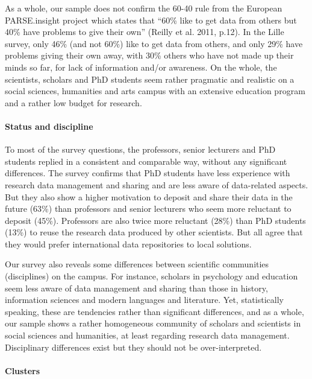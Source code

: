 \documentclass[a4paper,
fontsize=11pt,
oneside,
numbers=noperiodatend,
parskip=half-,
bibliography=totoc,
final
]{scrartcl}
\begin{document}
As a whole, our sample does not confirm the 60-40 rule from the European
PARSE.insight project which states that \enquote{60\% like to get data
from others but 40\% have problems to give their own} (Reilly et al.
2011, p.12). In the Lille survey, only 46\% (and not 60\%) like to get
data from others, and only 29\% have problems giving their own away,
with 30\% others who have not made up their minds so far, for lack of
information and/or awareness. On the whole, the scientists, scholars and
PhD students seem rather pragmatic and realistic on a social sciences,
humanities and arts campus with an extensive education program and a
rather low budget for research.

\paragraph{Status and discipline}\label{status-and-discipline}

To most of the survey questions, the professors, senior lecturers and
PhD students replied in a consistent and comparable way, without any
significant differences. The survey confirms that PhD students have less
experience with research data management and sharing and are less aware
of data-related aspects. But they also show a higher motivation to
deposit and share their data in the future (63\%) than professors and
senior lecturers who seem more reluctant to deposit (45\%). Professors
are also twice more reluctant (28\%) than PhD students (13\%) to reuse
the research data produced by other scientists. But all agree that they
would prefer international data repositories to local solutions.

Our survey also reveals some differences between scientific communities
(disciplines) on the campus. For instance, scholars in psychology and
education seem less aware of data management and sharing than those in
history, information sciences and modern languages and literature. Yet,
statistically speaking, these are tendencies rather than significant
differences, and as a whole, our sample shows a rather homogeneous
community of scholars and scientists in social sciences and humanities,
at least regarding research data management. Disciplinary differences
exist but they should not be over-interpreted.

\paragraph{Clusters}\label{clusters}
\end{document}
